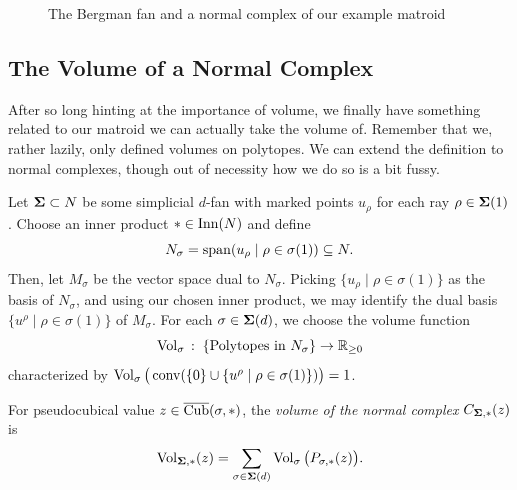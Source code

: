 \documentclass[12pt,oneside]{../../sfsuthesis}
\begin{document}
\begin{figure}[H]
\begin{subfigure}[t]{0.48\textwidth}
\begin{tikzpicture}[scale=1.5,tdplot_main_coords]
        \end{tikzpicture}
    \end{subfigure}
    \caption{The Bergman fan and a normal complex of our example matroid}
\end{figure}

\subsection{The Volume of a Normal Complex}
After so long hinting at the importance of volume, we finally have something related to our matroid we can actually take the volume of.
Remember that we, rather lazily, only defined volumes on polytopes.
We can extend the definition to normal complexes, though out of necessity how we do so is a bit fussy.
\begin{definition}\th\label{def:volNormalComplex}
    Let \( \bSigma \subset N \) be some simplicial \( d \)-fan with marked points \( u_\rho \) for each ray \( \rho \in \bSigma(1) \).
    Choose an inner product \( \ast \in \inn(N) \) and define
    \[
        N_\sigma = \Span(u_\rho \; | \; \rho \in \sigma(1)) \subseteq N.
    \]
    Then, let \( M_\sigma \) be the vector space dual to \( N_\sigma \).
    Picking \( \{ u_\rho \; | \; \rho \in \sigma(1) \} \) as the basis of \( N_\sigma \), and using our chosen inner product, we may identify the dual basis \( \{ u^\rho \; | \; \rho \in \sigma(1) \} \) of \( M_\sigma \).
    For each \( \sigma \in \bSigma(d) \), we choose the volume function
    \[
        \Vol_\sigma \,:\; \{\text{Polytopes in \( N_\sigma \)} \}  \to \R_{\geq 0}
    \]
    characterized by \( \Vol_\sigma\big( \conv( \{0\} \cup \{u^\rho \; | \; \rho \in \sigma(1)\})\big) = 1 \).

    For pseudocubical value \( z \in \pCub(\sigma, \ast) \), the \emph{volume of the normal complex} \(  C_{\bSigma, \ast}(z) \) is
    \[
        \Vol_{\bSigma, \ast}(z) = \sum_{\sigma \in \bSigma(d)} \Vol_\sigma\big(P_{\sigma, \ast}(z)\big).
    \]
\end{definition}
\end{document}

